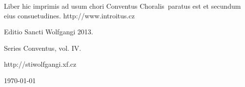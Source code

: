 \documentclass[a4paper, twoside, 12pt]{article}
\newcommand{\annusEditionis}{2013}
\begin{document}
\begin{center}
Liber hic imprimis ad usum chori 
\guillemotright Conventus Choralis\guillemotleft\ 
paratus est
et secundum eius consuetudines.
http://www.introitus.cz

\vspace{1cm}

{\large Editio Sancti Wolfgangi \annusEditionis .}

\vspace{2mm}

Series \guillemotright Conventus\guillemotleft, vol. IV.

\vspace{1cm}

http://stiwolfgangi.xf.cz

\vfill

\today

\end{center}
\end{document}
